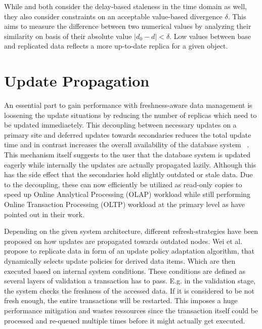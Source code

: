 While \cite{xiang:2008} and \cite{fekete:2018} both consider the delay-based staleness in the time domain as well, they also consider constraints on 
an acceptable value-based divergence $\delta$. This aims to measure the difference between two numerical values by analyzing their similarity on basis of their 
absolute value $|d_0 - d| < \delta $. Low values between base and replicated data reflects a more up-to-date replica for a given object.




\section{Update Propagation}
\label{r:replication}
An essential part to gain performance with freshness-aware data management is loosening the update situations by reducing the number of 
replicas which need to be updated immediaetely. This decoupling between necessary updates on a primary site and deferred updates towards secondaries 
reduces the total update time and in contrast increases the overall availability of the database system ~\cite{quorums:2003}.
This mechanism itself suggests to the user that the database system is updated eagerly while internally the updates are actually propagated lazily. 
Although this has the side effect that the secondaries hold slightly outdated or stale data.
Due to the decoupling, these can now efficiently be utilized as read-only copies to speed up Online Analytical Processing (OLAP) workload while still performing 
Online Transaction Processing (OLTP) workload
at the primary level as \cite{psaroudakis:2015, rohm:2002, xiang:2008} have pointed out in their work.

Depending on the given system architecture, different refresh-strategies have been proposed on how updates are propagated towards outdated nodes.
Wei et al. \cite{wei:2004} propose to replicate data in form of an update policy adaptation algorithm, that dynamically selects update policies
for derived data items. Which are then executed based on internal system conditions. These conditions are defined as several layers of validation a transaction has to pass.
E.g. in the validation stage, the system checks the freshness of the accessed data. If it is considered to be not fresh enough, the entire transactions will be restarted.
This imposes a huge performance mitigation and wastes ressources since the transaction itself could be processed and re-queued multiple times before it might actually get executed.\\

